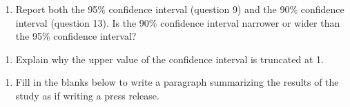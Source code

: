 \documentclass[
]{report}
\providecommand{\tightlist}{%
  \setlength{\itemsep}{0pt}\setlength{\parskip}{0pt}}
\begin{document}
\begin{enumerate}
\def\labelenumi{\arabic{enumi}.}
\setcounter{enumi}{15}
\tightlist
\item
  Report both the 95\% confidence interval (question 9) and the 90\% confidence interval (question 13). Is the 90\% confidence interval narrower or wider than the 95\% confidence interval?
\end{enumerate}

\vspace{0.5in}

\begin{enumerate}
\def\labelenumi{\arabic{enumi}.}
\setcounter{enumi}{16}
\tightlist
\item
  Explain why the upper value of the confidence interval is truncated at 1.
\end{enumerate}

\vspace{0.3in}


\begin{enumerate}
\def\labelenumi{\arabic{enumi}.}
\setcounter{enumi}{17}
\tightlist
\item
  Fill in the blanks below to write a paragraph summarizing the results of the study as if writing a press release.
\end{enumerate}
\end{document}
